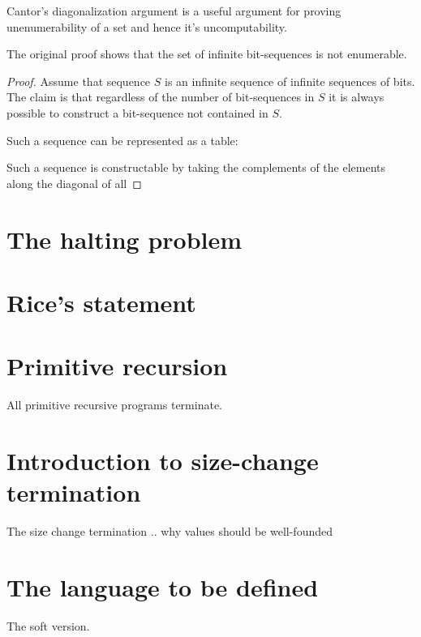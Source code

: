 Cantor's diagonalization argument is a useful argument for proving
unenumerability of a set and hence it's uncomputability.

The original proof shows that the set of infinite bit-sequences is not
enumerable.

\begin{proof} Assume that sequence $S$ is an infinite sequence of infinite
sequences of bits. The claim is that regardless of the number of bit-sequences
in $S$ it is always possible to construct a bit-sequence not contained in $S$.

Such a sequence can be represented as a table:


Such a sequence is constructable by taking the complements of the elements along the diagonal of all 



\end{proof}


\section{The halting problem}

\section{Rice's statement}


\section{Primitive recursion}

All primitive recursive programs terminate.

\section{Introduction to size-change termination}

The size change termination .. why values should be well-founded

\section{The language to be defined}

The soft version.
